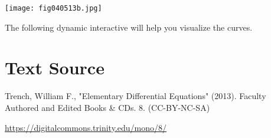 \documentclass{ximera}
\begin{document}
\begin{example}
\begin{explanation}
\begin{image}
  \texttt{[image: fig040513b.jpg]}
\end{image}

The following dynamic interactive will help you visualize the curves.

\begin{center}  
\end{center}

 
\end{explanation}
\end{example}
 
 
\section*{Text Source}
Trench, William F., "Elementary Differential Equations" (2013). Faculty Authored and Edited Books \& CDs. 8. (CC-BY-NC-SA)
 
\href{https://digitalcommons.trinity.edu/mono/8/}{https://digitalcommons.trinity.edu/mono/8/}
 
 
\end{document}
